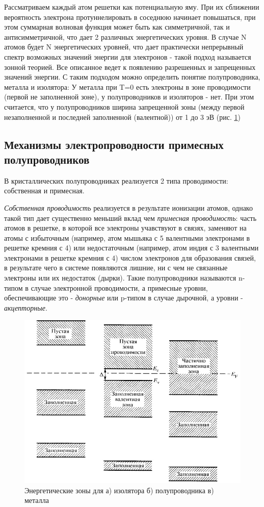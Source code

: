 \documentclass[a4paper, 12pt]{article}
\begin{document}
Рассматриваем каждый атом решетки как потенциальную яму. При их сближении вероятность электрона протуннелировать в соседнюю начинает повышаться, при этом суммарная волновая функция может быть как симметричной, так и антисимметричной, что дает 2 различных энергетических уровня. В случае N атомов будет N энергетических уровней, что дает практически непрерывный спектр возможных значений энергии для электронов - такой подход называется зонной теорией. Все описанное ведет к появлению разрешенных и запрещенных значений энергии. С таким подходом можно определить понятие полупроводника, металла и изолятора: У металла при T=0 есть электроны в зоне проводимости (первой не заполненной зоне), у полупроводников и изоляторов - нет. При этом считается, что у полупроводников ширина запрещенной зоны (между первой незаполненной и последней заполненной (валентной)) от 1 до 3 эВ (рис. \ref{fig:theor_pic_0})

\subsection*{Механизмы электропроводности примесных полупроводников}

В кристаллических полупроводниках реализуется 2 типа проводимости: собственная и примесная.

\textit{Собственная проводимость} реализуется в результате ионизации атомов, однако такой тип дает существенно меньший вклад чем \textit{примесная проводимость}: часть атомов в решетке, в которой все электроны учавствуют в связях, заменяют на атомы с избыточным (например, атом мышьяка с 5 валентными электронами в решетке кремния с 4) или недостаточным (например, атом индия с 3 валентными электронами в решетке кремния с 4) числом электронов для образования связей, в результате чего в системе появляются лишние, ни с чем не связанные электроны или их недостаток (дырки). Такие полупроводники называются n-типом в случае электронной проводимости, а примесные уровни, обеспечивающие это - \textit{донорные} или p-типом в случае дырочной, а уровни - \textit{акцепторные}.

\begin{figure}[H]
    \centering
    \includegraphics[width=0.7\linewidth]{Theor_pic_0.png}
    \caption{Энергетические зоны для а) изолятора б) полупроводника в) металла }
    \label{fig:theor_pic_0}
\end{figure}
\end{document}
